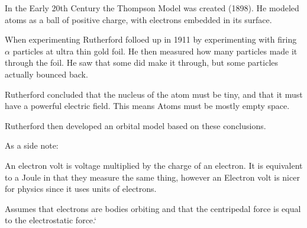 \documentclass{report}
\begin{document}
\begin{description}
\begin{mdframed}
            In the Early 20th Century the Thompson Model
            was created (1898). He modeled atoms as a ball
            of positive charge, with electrons embedded in
            its surface.

            When experimenting Rutherford folloed up in 1911
            by experimenting with firing $\alpha$ particles
            at ultra thin gold foil. He then measured
            how many particles made it through the foil.
            He saw that some did make it through, but some
            particles actually bounced back.

            Rutherford concluded that the nucleus of the atom
            must be tiny, and that it must have a powerful
            electric field. This means Atoms must be mostly
            empty space.

            Rutherford then developed an orbital model
            based on these conclusions.

            As a side note:
            \begin{mdframed}
                An electron volt is voltage multiplied by
                the charge of an electron. It is equivalent
                to a Joule in that they measure the same thing,
                however an Electron volt is nicer for
                physics since it uses units of electrons.
            \end{mdframed}
            
            Assumes that electrons are bodies orbiting
            and that the centripedal force is equal
            to the electrostatic force.`
            
        \end{mdframed}
\end{description}
\end{document}
